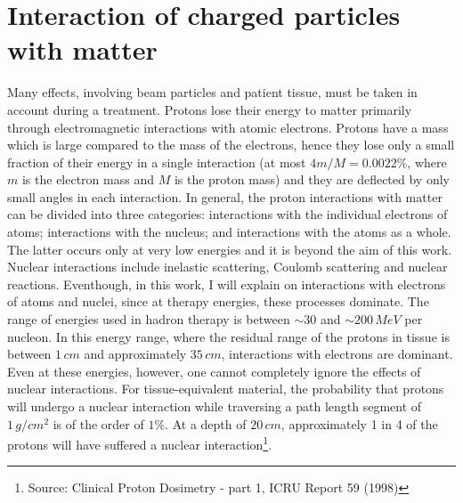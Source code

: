 \documentclass[12pt, a4paper, twoside]{book}
\begin{document}
\section{Interaction of charged particles with matter}
Many effects, involving beam particles and patient tissue, must be taken in account during a treatment.
Protons lose their energy to matter primarily through electromagnetic interactions with atomic electrons. Protons have a mass which is large compared to the mass of the electrons, hence they lose only a small fraction of their energy in a single interaction (at most $4 m/M = 0.0022\%$, where $m$ is the electron mass and $M$ is the proton mass) and they are deflected by only small angles in each interaction.
In general, the proton interactions with matter can be divided into three categories: interactions with the individual electrons of atoms; interactions with the nucleus; and interactions with the atoms as a whole. The latter occurs only at very low energies and it is beyond the aim of this work. Nuclear interactions include inelastic scattering, Coulomb scattering and nuclear reactions. Eventhough, in this work, I will explain on interactions with electrons of atoms and nuclei, since at therapy energies, these processes dominate.  
The range of energies used in hadron therapy is between $\sim30$ and $\sim200\,MeV$ per nucleon. 
In this energy range, where the residual range of the protons in tissue is between $1\,cm$ and approximately $35\,cm$, interactions with electrons are dominant. Even at these energies, however, one cannot completely ignore the effects
of nuclear interactions. For tissue-equivalent material, the probability that protons will undergo a nuclear interaction while traversing a path length segment of $1\,g/cm^{2}$ is of the order of $1\%$. At a depth of $20\,cm$, approximately 1 in 4 of the protons will have suffered a nuclear interaction\footnote{Source: Clinical Proton Dosimetry - part 1, ICRU Report 59 (1998)}. 
\end{document}
